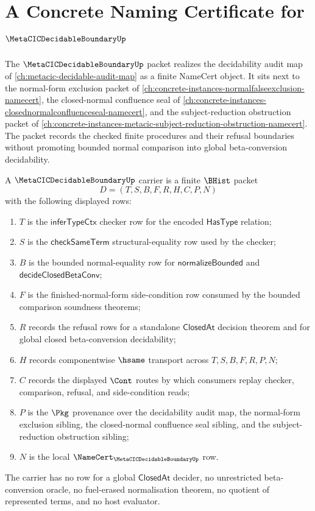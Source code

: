 \chapter{A Concrete Naming Certificate for $\MetaCICDecidableBoundaryUp$}
\label{ch:concrete-instances-metacicdecidableboundary-namecert}

The $\MetaCICDecidableBoundaryUp$ packet realizes the decidability audit map of \autoref{ch:metacic-decidable-audit-map} as a finite NameCert object. It sits next to the normal-form exclusion packet of \autoref{ch:concrete-instances-normalfalseexclusion-namecert}, the closed-normal confluence seal of \autoref{ch:concrete-instances-closednormalconfluenceseal-namecert}, and the subject-reduction obstruction packet of \autoref{ch:concrete-instances-metacic-subject-reduction-obstruction-namecert}. The packet records the checked finite procedures and their refusal boundaries without promoting bounded normal comparison into global beta-conversion decidability.

\begin{definition}
\label{def:metacic-decidable-boundary-carrier}
A $\MetaCICDecidableBoundaryUp$ carrier is a finite $\BHist$ packet
$$
D=(T,S,B,F,R,H,C,P,N)
$$
with the following displayed rows:
\begin{enumerate}
\item $T$ is the $\mathsf{inferTypeCtx}$ checker row for the encoded $\mathsf{HasType}$ relation;
\item $S$ is the $\mathsf{checkSameTerm}$ structural-equality row used by the checker;
\item $B$ is the bounded normal-equality row for $\mathsf{normalizeBounded}$ and $\mathsf{decideClosedBetaConv}$;
\item $F$ is the finished-normal-form side-condition row consumed by the bounded comparison soundness theorems;
\item $R$ records the refusal rows for a standalone $\mathsf{ClosedAt}$ decision theorem and for global closed beta-conversion decidability;
\item $H$ records componentwise $\hsame$ transport across $T,S,B,F,R,P,N$;
\item $C$ records the displayed $\Cont$ routes by which consumers replay checker, comparison, refusal, and side-condition reads;
\item $P$ is the $\Pkg$ provenance over the decidability audit map, the normal-form exclusion sibling, the closed-normal confluence seal sibling, and the subject-reduction obstruction sibling;
\item $N$ is the local $\NameCert_{\MetaCICDecidableBoundaryUp}$ row.
\end{enumerate}
The carrier has no row for a global $\mathsf{ClosedAt}$ decider, no unrestricted beta-conversion oracle, no fuel-erased normalisation theorem, no quotient of represented terms, and no host evaluator.
\end{definition}

